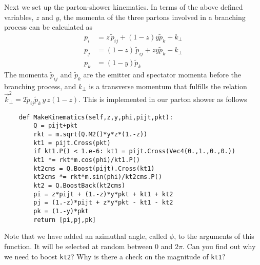 \documentclass[10pt,fleqn]{scrartcl}
\begin{document}
Next we set up the parton-shower kinematics. In terms of the above defined
variables, $z$ and $y$, the momenta of the three partons involved in a branching 
process can be calculated as
\begin{equation}\label{eq:kinematics}
  \begin{split}
    p_i&=z\,\tilde{p}_{ij}+(1-z)y\tilde{p}_k+k_\perp\\
    p_j&=(1-z)\,\tilde{p}_{ij}+zy\tilde{p}_k-k_\perp\\
    p_k&=(1-y)\tilde{p}_k
  \end{split}
\end{equation}
The momenta $\tilde{p}_{ij}$ and $\tilde{p}_k$ are the emitter and spectator
momenta before the branching process, and $k_\perp$ is a transverse momentum
that fulfills the relation $\vec{k}_\perp^2=2\tilde{p}_{ij}\tilde{p}_k\,y\,z(1-z)$.
This is implemented in our parton shower as follows
\begin{verbatim}
    def MakeKinematics(self,z,y,phi,pijt,pkt):
        Q = pijt+pkt
        rkt = m.sqrt(Q.M2()*y*z*(1.-z))
        kt1 = pijt.Cross(pkt)
        if kt1.P() < 1.e-6: kt1 = pijt.Cross(Vec4(0.,1.,0.,0.))
        kt1 *= rkt*m.cos(phi)/kt1.P()
        kt2cms = Q.Boost(pijt).Cross(kt1)
        kt2cms *= rkt*m.sin(phi)/kt2cms.P()
        kt2 = Q.BoostBack(kt2cms)
        pi = z*pijt + (1.-z)*y*pkt + kt1 + kt2
        pj = (1.-z)*pijt + z*y*pkt - kt1 - kt2
        pk = (1.-y)*pkt
        return [pi,pj,pk]

\end{verbatim}
Note that we have added an azimuthal angle, called $\phi$, to the arguments of this function.
It will be selected at random between 0 and $2\pi$. Can you find out why we need to boost 
{\tt kt2}? Why is there a check on the magnitude of {\tt kt1}?
\end{document}
